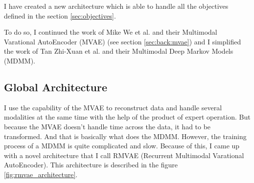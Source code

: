\documentclass[12pt]{report}
\begin{document}
I have created a new architecture which is able to handle all the objectives defined in the section \ref{sec:objectives}.

To do so, I continued the work of Mike We et al. \cite{wu_multimodal_2018} and their Multimodal Varational AutoEncoder (MVAE) (see section \ref{sec:back:mvae}) and I simplified the work of Tan Zhi-Xuan et al. \cite{tan_factorized_2019} and their Multimodal Deep Markov Models (MDMM).

\subsection{Global Architecture}

I use the capability of the MVAE to reconstruct data and handle several modalities at the same time with the help of the product of expert operation.
But because the MVAE doesn't handle time across the data, it had to be transformed.
And that is basically what does the MDMM.
However, the training process of a MDMM is quite complicated and slow.
Because of this, I came up with a novel architecture that I call RMVAE (Recurrent Multimodal Varational AutoEncoder).
This architecture is described in the figure \ref{fig:rmvae_architecture}.
\end{document}
